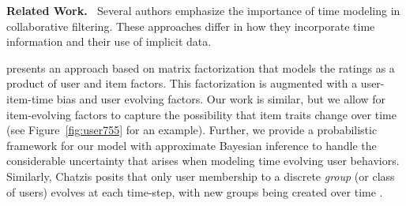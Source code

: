 \documentclass{sig-alternate}
\newcommand{\mypar}[1]{\vspace{0.1in}\noindent \textbf{#1 \,}}
\begin{document}
 
\begin{comment}
\begin{tabular}{p{1.25in}p{1.5in}}
\hline 
HMM & implicit + explicit data. \\ \hline 
Dynamic Bayesian Probabilistic Matrix Factorization & Gaussian observations, non-parametric user model over time \\ \hline 
Dynamic matrix factorization & Gaussian observations, user model over time, Kalman filtering for MAP inference \\ \hline 
Cross-Domain Collaborative Filtering over Time & extension of Bi-LDA over
time, matrix factorization with dirichlet-multinomials gen.
model. user \& item time model. Inference via sampling.  \\ \hline 
A collaborative Kalman filter for time-evolving dyadic processes & Gaussian observations. user and item time model. mean-field inference. \\ \hline 
Temporal Collaborative Filtering with Bayesian Probabilistic Tensor
Factorization & Data is encoded as a tensor. Time latent factors follow a
kalman-filter like evolution. \\ \hline 
TimesSVD++ (Koren) & MAP in a Gaussian model. Has global and
time-dependant factors but not as biases (not vectors) \\ \hline 
Nonparametric Bayesian Factor Analysis for Dynamic Count Matrices & Poisson observations. Non-parametric. Sampling-based inference \\ \hline 
\end{tabular}
\end{comment}

\mypar{Related Work.} Several authors emphasize the importance of
time modeling in collaborative filtering. These approaches differ in
how they incorporate time information and their use of implicit data.

\citet{DBLP:journals/cacm/Koren10} presents an approach based
on matrix factorization that models the ratings as a product of
user and item factors. This factorization is augmented with a user-item-time
bias and user evolving factors. Our work is similar, but we allow for item-evolving
factors to capture the possibility that item traits change over time (see Figure~\ref{fig:user755} for an example).
Further, we provide a probabilistic framework for our model with approximate
Bayesian inference to handle the considerable uncertainty that arises when
modeling time evolving user behaviors.  Similarly, Chatzis posits that only user membership
to a discrete \emph{group} (or class of users) evolves at each time-step, with new groups being 
created over time \cite{AAAI148136}.
\end{document}
